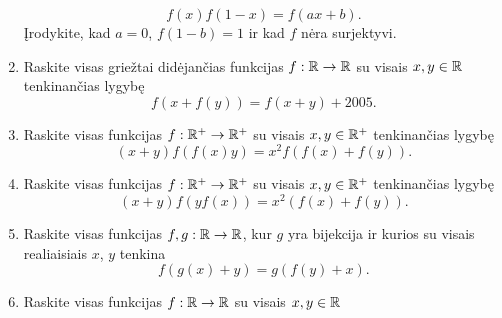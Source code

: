 \begin{enumerate}
    $$f(x)f(1-x)=f(ax+b).$$ Įrodykite, kad $a=0$, $f(1-b)=1$ ir kad $f$
    nėra surjektyvi.
  \item Raskite visas griežtai didėjančias funkcijas $f:\mathbb R\to\mathbb R$ su visais
    $x,y \in \mathbb R$ tenkinančias lygybę $$f(x+f(y))=f(x+y)+2005.$$
  \item Raskite visas funkcijas $f:\mathbb R^+\to\mathbb R^+$ su visais $x, y \in \mathbb R^+$
    tenkinančias lygybę $$(x+y)f(f(x)y)=x^2f(f(x)+f(y)).$$
  \item Raskite visas funkcijas $f:\mathbb R^+\to\mathbb R^+$ su visais $x, y \in \mathbb R^+$
    tenkinančias lygybę $$(x+y)f(yf(x))=x^2(f(x)+f(y)).$$
  \item Raskite visas funkcijas $f,g:\mathbb R\to\mathbb R$, kur $g$ yra bijekcija ir
    kurios su visais realiaisiais $x$, $y$ tenkina $$f(g(x)+y)=g(f(y)+x).$$
  \item Raskite visas funkcijas $f:\mathbb R\to\mathbb R$ su visais $x, y \in \mathbb R$

\end{enumerate}
